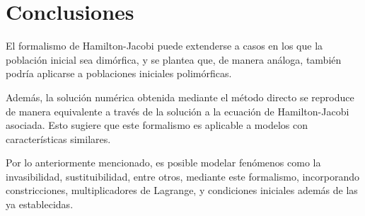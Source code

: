 \section{Conclusiones}

El formalismo de Hamilton-Jacobi puede extenderse a casos en los que la población inicial sea dimórfica, y se plantea que, de manera análoga, también podría aplicarse a poblaciones iniciales polimórficas.

Además, la solución numérica obtenida mediante el método directo se reproduce de manera equivalente a través de la solución a la ecuación de Hamilton-Jacobi asociada. Esto sugiere que este formalismo es aplicable a modelos con características similares.

Por lo anteriormente mencionado, es posible modelar fenómenos como la invasibilidad, sustituibilidad, entre otros, mediante este formalismo, incorporando constricciones, multiplicadores de Lagrange, y condiciones iniciales además de las ya establecidas.
